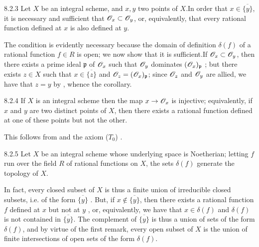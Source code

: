 \documentclass[10pt,oneside]{book}
\begin{document}
\begin{envs}[Corollary]{8.2.3}
\label{cor-1.8.2.3}
Let $X$ be an integral scheme, and $x,y$ two
points of $X$.In order that $x\in\overline{\{y\}}$, it is necessary and
sufficient that $\mathscr{O}_x\subset\mathscr{O}_y$, or, equivalently, that every rational
function defined at $x$ is also defined at $y$.
\end{envs}

The condition is evidently necessary because the domain of definition
$\delta(f)$ of a rational function $f\in R$ is open; we now show that it is
sufficient.If $\mathscr{O}_x\subset\mathscr{O}_y$, then there exists a prime ideal
$\mathfrak{p}$ of $\mathscr{O}_x$ such that $\mathscr{O}_y$ dominates $(\mathscr{O}_x)_\mathfrak{p}$
; but  there exists $z\in X$ such that
$x\in\overline{\{z\}}$ and $\mathscr{O}_z=(\mathscr{O}_x)_\mathfrak{p}$; since $\mathscr{O}_z$ and $\mathscr{O}_y$
are allied, we have that $z=y$ by , whence the corollary.

\begin{envs}[Corollary]{8.2.4}
\label{cor-1.8.2.4}
If $X$ is an integral scheme then the map
$x\to\mathscr{O}_x$ is injective; equivalently, if $x$ and $y$ are two distinct points of
$X$, then there exists a rational function defined at one of these points but
not the other.
\end{envs}

This follows from  and the axiom ($T_0$) .

\begin{envs}[Corollary]{8.2.5}
\label{cor-1.8.2.5}
Let $X$ be an integral scheme whose underlying
space is Noetherian; letting $f$ run over the field $R$ of rational functions on
$X$, the sets $\delta(f)$ generate the topology of $X$.
\end{envs}

In fact, every closed subset of $X$ is thus a finite union of irreducible closed
subsets, i.e. of the form $\overline{\{y\}}$ . But, if
$x\not\in\overline{\{y\}}$, then there exists a rational function $f$ defined at
$x$ but not at $y$ , or, equivalently, we have that $x\in\delta(f)$
and $\delta(f)$ is not contained in $\overline{\{y\}}$. The complement  of
$\overline{\{y\}}$ is thus a union of sets of the form $\delta(f)$, and by
virtue of the first remark, every open subset of $X$ is the union of finite
intersections of open sets of the form $\delta(f)$.
\end{document}
